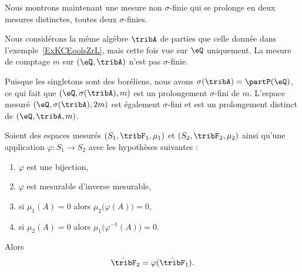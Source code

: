 
\begin{example}
	Nous montrons maintenant une mesure non \( \sigma\)-finie qui se prolonge en deux mesures distinctes, toutes deux \( \sigma\)-finies.

	Nous considérons la même algèbre \( \tribA\) de parties que celle donnée dans l'exemple~\ref{ExKCEoolsZrL}, mais cette fois vue sur \( \eQ\) uniquement. La mesure de comptage \( m\) sur \( (\eQ,\tribA)\) n'est pas \( \sigma\)-finie.

	Puisque les singletons sont des boréliens, nous avons \( \sigma(\tribA)=\partP(\eQ)\), ce qui fait que \( (\eQ,\sigma(\tribA),m)\) est un prolongement \( \sigma\)-fini de \( m\). L'espace mesuré \( (\eQ,\sigma(\tribA),2m)\) est également \( \sigma\)-fini et est un prolongement distinct de \( (\eQ,\tribA,m)\).
\end{example}

\begin{proposition}     \label{PROPooORDCooJEsjzR}
	Soient des espaces mesurés \( (S_1,\tribF_1,\mu_1)\) et \( (S_2,\tribF_2, \mu_2)\) ainsi qu'une application \( \varphi\colon S_1\to S_2\) avec les hypothèses suivantes :
	\begin{enumerate}
		\item
		      \( \varphi\) est une bijection,
		\item
		      \( \varphi\) est mesurable d'inverse mesurable,
		\item
		      si \( \mu_1(A)=0\) alors \( \mu_2\big( \varphi(A) \big)=0\),
		\item
		      si \( \mu_2(A)=0\) alors \( \mu_1\big( \varphi^{-1}(A) \big)=0\).
	\end{enumerate}
	Alors
	\begin{equation}
		\hat\tribF_2=\varphi(\hat\tribF_1).
	\end{equation}
\end{proposition}

